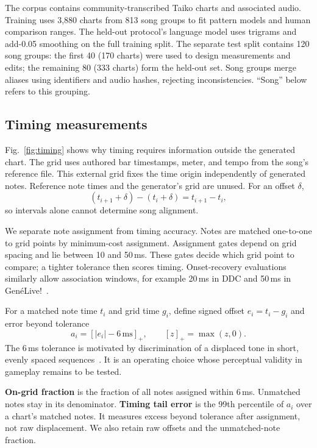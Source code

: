 \documentclass[letterpaper]{article}
\newcommand{\pos}[1]{\left[#1\right]_+}
\begin{document}
The corpus contains community-transcribed Taiko charts and associated audio.
Training uses 3{,}880 charts from 813 song groups to fit pattern models and
human comparison ranges. The held-out protocol's language model uses
trigrams and add-0.05 smoothing on the full training split.
The separate test split contains 120 song groups:
the first 40 (170 charts) were used to design measurements and edits; the
remaining 80 (333 charts) form the held-out set. Song groups merge aliases
using identifiers and audio hashes, rejecting inconsistencies. ``Song''
below refers to this grouping.

\subsection{Timing measurements}
Fig.~\ref{fig:timing} shows why timing requires information outside the
generated chart. The grid uses authored bar timestamps, meter, and
tempo from the song's reference file. This external grid fixes the time
origin independently of generated notes. Reference note times and the
generator's grid are unused. For an offset $\delta$,
\begin{equation}
 (t_{i+1}+\delta)-(t_i+\delta)=t_{i+1}-t_i,
 \label{eq:shift}
\end{equation}
so intervals alone cannot determine song alignment.

We separate note assignment from timing accuracy. Notes are matched
one-to-one to grid points by minimum-cost assignment. Assignment gates depend
on grid spacing and lie between 10 and 50\,ms. These gates decide which grid
point to compare; a tighter tolerance then scores timing. Onset-recovery
evaluations similarly allow association windows, for example 20\,ms in DDC
and 50\,ms in Gen\'eLive!~\cite{donahue2017ddc,takada2023genelive}.

For a matched note time $t_i$ and grid time $g_i$, define signed offset
$e_i=t_i-g_i$ and error beyond tolerance
\begin{equation}
 a_i=\pos{|e_i|-6\,\mathrm{ms}},\qquad [z]_+=\max(z,0).
 \label{eq:error}
\end{equation}
The 6\,ms tolerance is motivated by discrimination of a displaced tone in
short, evenly spaced sequences~\cite{friberg1995jnd}. It is an operating
choice whose perceptual validity in gameplay remains to be tested.

\textbf{On-grid fraction} is the fraction of all notes assigned within
6\,ms. Unmatched notes stay in its denominator. \textbf{Timing tail error}
is the 99th percentile of $a_i$ over a chart's matched notes. It
measures excess beyond tolerance after assignment, not raw displacement.
We also retain raw offsets and the unmatched-note fraction.
\end{document}

